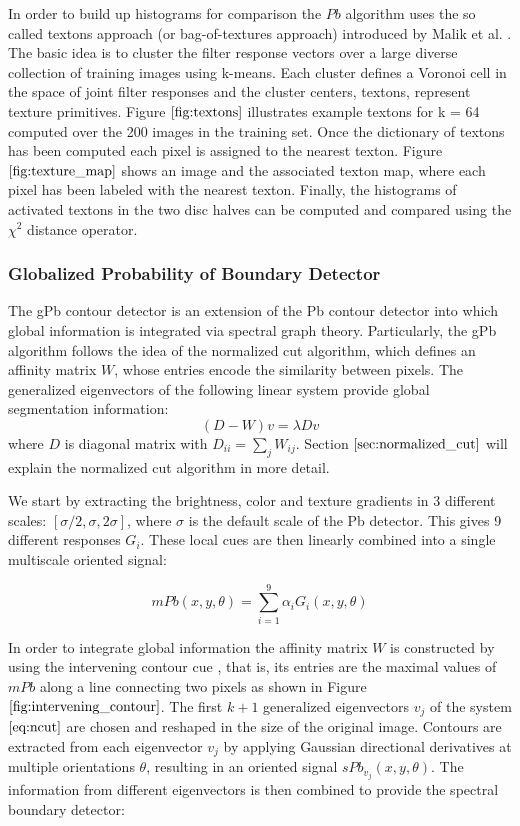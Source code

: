 \documentclass{SMBV13}
\begin{document}
In order to build up histograms for comparison the $Pb$ algorithm uses the so called textons approach (or bag-of-textures approach) introduced by Malik et al. \cite{malik2001contour}. The basic idea is to cluster the filter response vectors over a large diverse collection of training images using k-means. Each cluster defines a Voronoi cell in the space of joint filter responses and the cluster centers, textons, represent texture primitives. Figure $\ref{fig:textons}$ illustrates example textons for k = 64 computed over the 200 images in the training set. Once the dictionary of textons has been computed each pixel is assigned to the nearest texton. Figure $\ref{fig:texture_map}$ shows an image and the associated texton map, where each pixel has been labeled with the nearest texton. Finally, the histograms of activated textons in the two disc halves can be computed and compared using the $\chi^2$ distance operator.


\subsubsection{Globalized Probability of Boundary Detector}

The gPb contour detector \cite{maire2008using} is an extension of the Pb contour detector into which global information is integrated via spectral graph theory. Particularly, the gPb algorithm follows the idea of the normalized cut algorithm, which defines an affinity matrix $W$, whose entries encode the similarity between pixels. The generalized eigenvectors of the following linear system provide global segmentation information:
\begin{equation}
(D-W)v = \lambda D v
\label{eq:ncut}
\end{equation}
where $D$ is diagonal matrix with $D_{ii} = \sum_j W_{ij}$.
Section $\ref{sec:normalized_cut}$ will explain the normalized cut algorithm in more detail.

We start by extracting the brightness, color and texture gradients in 3 different scales: $[\sigma/2, \sigma, 2\sigma]$, where $\sigma$ is the default scale of the Pb detector. This gives 9 different responses ${G_i}$. These local cues are then linearly combined into a single multiscale oriented signal:

\begin{equation}
mPb(x, y, \theta) = \sum\limits_{i = 1}^{9}\alpha_i G_i(x, y, \theta)
\end{equation}

In order to integrate global information the affinity matrix $W$ is constructed by using the intervening contour cue \cite{leung1998contour}, that is, its entries are the maximal values of $mPb$ along a line connecting two pixels as shown in Figure $\ref{fig:intervening_contour}$. The first $k + 1$ generalized eigenvectors $v_j$ of the system $\ref{eq:ncut}$ are chosen and reshaped in the size of the original image. Contours are extracted from each eigenvector $v_j$ by applying Gaussian directional derivatives at multiple orientations $\theta$, resulting in an oriented signal $sPb_{v_j}(x, y, \theta)$. The information from different eigenvectors is then combined to provide the spectral boundary detector:
\end{document}
